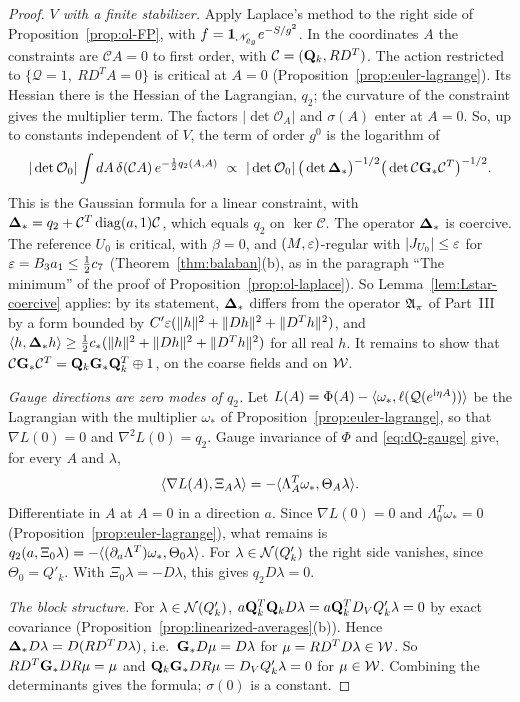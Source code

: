 \begin{proof}
\emph{$V$ with a finite stabilizer.} Apply Laplace's method to the right side of Proposition~\ref{prop:ol-FP}, with $f=\mathbf 1_{\mathscr N_{\varrho_g}}e^{-S/g^2}$. In the coordinates $A$ the constraints are $\mathcal CA=0$ to first order, with $\mathcal C=(\mathbf Q_k,RD^T)$. The action restricted to $\{\mathcal Q=1,\ RD^TA=0\}$ is critical at $A=0$ (Proposition~\ref{prop:euler-lagrange}). Its Hessian there is the Hessian of the Lagrangian, $q_2$; the curvature of the constraint gives the multiplier term. The factors $|\det\mathcal O_A|$ and $\sigma(A)$ enter at $A=0$. So, up to constants independent of $V$, the term of order $g^0$ is the logarithm of
\[
|\det\mathcal O_0|\int dA\,\delta(\mathcal CA)\,e^{-\frac12q_2(A,A)}\ \propto\ |\det\mathcal O_0|\,\big(\det\boldsymbol{\Delta}_*\big)^{-1/2}\big(\det\mathcal C\mathbf G_*\mathcal C^T\big)^{-1/2}.
\]
This is the Gaussian formula for a linear constraint, with $\boldsymbol{\Delta}_*=q_2+\mathcal C^T\operatorname{diag}(a,1)\mathcal C$, which equals $q_2$ on $\ker\mathcal C$. The operator $\boldsymbol{\Delta}_*$ is coercive. The reference $U_0$ is critical, with $\beta=0$, and $(M,\varepsilon)$-regular with $|J_{U_0}|\le\varepsilon$ for $\varepsilon=B_3a_1\le\frac12c_7$ (Theorem~\ref{thm:balaban}(b), as in the paragraph ``The minimum'' of the proof of Proposition~\ref{prop:ol-laplace}). So Lemma~\ref{lem:Lstar-coercive} applies: by its statement, $\boldsymbol{\Delta}_*$ differs from the operator $\mathfrak A_\pi$ of Part~III by a form bounded by $C'\varepsilon(\|h\|^2+\|Dh\|^2+\|D^Th\|^2)$, and $\langle h,\boldsymbol{\Delta}_*h\rangle\ge\frac12c_*(\|h\|^2+\|Dh\|^2+\|D^Th\|^2)$ for all real $h$. It remains to show that $\mathcal C\mathbf G_*\mathcal C^T=\mathbf Q_k\mathbf G_*\mathbf Q_k^T\oplus1$, on the coarse fields and on $\mathcal W$.

\emph{Gauge directions are zero modes of $q_2$.} Let $L(A)=\Phi(A)-\langle \omega_*,\ell(\mathcal Q(e^{\mathrm i\eta A}))\rangle$ be the Lagrangian with the multiplier $\omega_*$ of Proposition~\ref{prop:euler-lagrange}, so that $\nabla L(0)=0$ and $\nabla^2L(0)=q_2$. Gauge invariance of $\Phi$ and \eqref{eq:dQ-gauge} give, for every $A$ and $\lambda$,
\[
\langle \nabla L(A),\Xi_A\lambda\rangle=-\langle \Lambda_A^T\omega_*,\Theta_A\lambda\rangle.
\]
Differentiate in $A$ at $A=0$ in a direction $a$. Since $\nabla L(0)=0$ and $\Lambda_0^T\omega_*=0$ (Proposition~\ref{prop:euler-lagrange}), what remains is $q_2(a,\Xi_0\lambda)=-\langle (\partial_a\Lambda^T)\omega_*,\Theta_0\lambda\rangle$. For $\lambda\in\mathcal N(Q'_k)$ the right side vanishes, since $\Theta_0=Q'_k$. With $\Xi_0\lambda=-D\lambda$, this gives $q_2D\lambda=0$.

\emph{The block structure.} For $\lambda\in\mathcal N(Q'_k)$, $a\mathbf Q_k^T\mathbf Q_kD\lambda=a\mathbf Q_k^TD_VQ'_k\lambda=0$ by exact covariance (Proposition~\ref{prop:linearized-averages}(b)). Hence $\boldsymbol{\Delta}_*D\lambda=D(RD^TD\lambda)$, i.e.\ $\mathbf G_*D\mu=D\lambda$ for $\mu=RD^TD\lambda\in\mathcal W$. So $RD^T\mathbf G_*DR\mu=\mu$ and $\mathbf Q_k\mathbf G_*DR\mu=D_VQ'_k\lambda=0$ for $\mu\in\mathcal W$. Combining the determinants gives the formula; $\sigma(0)$ is a constant.


\end{proof}
